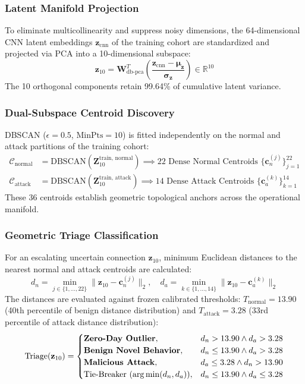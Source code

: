 \documentclass[preprint,12pt]{elsarticle}
\begin{document}
\subsubsection{Latent Manifold Projection}
To eliminate multicollinearity and suppress noisy dimensions, the 64-dimensional CNN latent embeddings $\mathbf{z}_{\text{cnn}}$ of the training cohort are standardized and projected via PCA into a 10-dimensional subspace:
\begin{equation}
    \mathbf{z}_{10} = \mathbf{W}_{\text{db-pca}}^T \left( \frac{\mathbf{z}_{\text{cnn}} - \boldsymbol{\mu}_{\mathbf{z}}}{\boldsymbol{\sigma}_{\mathbf{z}}} \right) \in \mathbb{R}^{10}
\end{equation}
The 10 orthogonal components retain 99.64\% of cumulative latent variance.

\subsubsection{Dual-Subspace Centroid Discovery}
DBSCAN ($\epsilon = 0.5$, $\text{MinPts} = 10$) is fitted independently on the normal and attack partitions of the training cohort:
\begin{align}
    \mathcal{C}_{\text{normal}} &= \text{DBSCAN}(\mathbf{Z}_{10}^{\text{train, normal}}) \implies 22 \text{ Dense Normal Centroids } \{\mathbf{c}_n^{(j)}\}_{j=1}^{22} \\
    \mathcal{C}_{\text{attack}} &= \text{DBSCAN}(\mathbf{Z}_{10}^{\text{train, attack}}) \implies 14 \text{ Dense Attack Centroids } \{\mathbf{c}_a^{(k)}\}_{k=1}^{14}
\end{align}
These 36 centroids establish geometric topological anchors across the operational manifold.

\subsubsection{Geometric Triage Classification}
For an escalating uncertain connection $\mathbf{z}_{10}$, minimum Euclidean distances to the nearest normal and attack centroids are calculated:
\begin{equation}
    d_n = \min_{j \in \{1,\dots,22\}} \|\mathbf{z}_{10} - \mathbf{c}_n^{(j)}\|_2, \quad d_a = \min_{k \in \{1,\dots,14\}} \|\mathbf{z}_{10} - \mathbf{c}_a^{(k)}\|_2
\end{equation}
The distances are evaluated against frozen calibrated thresholds: $T_{\text{normal}} = 13.90$ (40th percentile of benign distance distribution) and $T_{\text{attack}} = 3.28$ (33rd percentile of attack distance distribution):
\begin{equation}
    \text{Triage}(\mathbf{z}_{10}) = \begin{cases}
        \text{\textbf{Zero-Day Outlier}}, & d_n > 13.90 \land d_a > 3.28 \\
        \text{\textbf{Benign Novel Behavior}}, & d_n \le 13.90 \land d_a > 3.28 \\
        \text{\textbf{Malicious Attack}}, & d_a \le 3.28 \land d_n > 13.90 \\
        \text{Tie-Breaker } (\arg\min(d_n, d_a)), & d_n \le 13.90 \land d_a \le 3.28
    \end{cases}
\end{equation}
\end{document}
